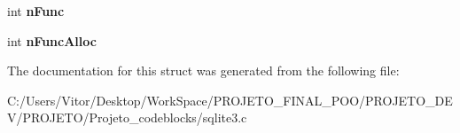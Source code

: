\begin{DoxyCompactItemize}
\item 
\hypertarget{struct_agg_info_a5bfde7ca00d28da6edbda523ab038e38}{int {\bfseries n\-Func}}\label{struct_agg_info_a5bfde7ca00d28da6edbda523ab038e38}

\item 
\hypertarget{struct_agg_info_a97c3bcfc404c3b328242c7698adacd05}{int {\bfseries n\-Func\-Alloc}}\label{struct_agg_info_a97c3bcfc404c3b328242c7698adacd05}

\end{DoxyCompactItemize}


The documentation for this struct was generated from the following file\-:\begin{DoxyCompactItemize}
\item 
C\-:/\-Users/\-Vitor/\-Desktop/\-Work\-Space/\-P\-R\-O\-J\-E\-T\-O\-\_\-\-F\-I\-N\-A\-L\-\_\-\-P\-O\-O/\-P\-R\-O\-J\-E\-T\-O\-\_\-\-D\-E\-V/\-P\-R\-O\-J\-E\-T\-O/\-Projeto\-\_\-codeblocks/sqlite3.\-c\end{DoxyCompactItemize}
